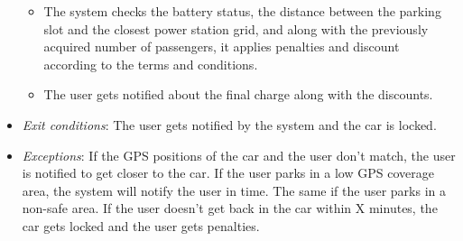 \begin{itemize}
\begin{itemize}
		\item The system checks the battery status, the distance between the parking slot and the closest power station grid, and along with the previously acquired number of passengers, it applies penalties and discount according to the terms and conditions.
		\item The user gets notified about the final charge along with the discounts.
	\end{itemize}
	\item \emph{Exit conditions}: The user gets notified by the system and the car is locked.
	\item \emph{Exceptions}: If the GPS positions of the car and the user don't match, the user is notified to get closer to the car. If the user parks in a low GPS coverage area, the system will notify the user in time. The same if the user parks in a non-safe area. If the user doesn't get back in the car within X minutes, the car gets locked and the user gets penalties.
\end{itemize}